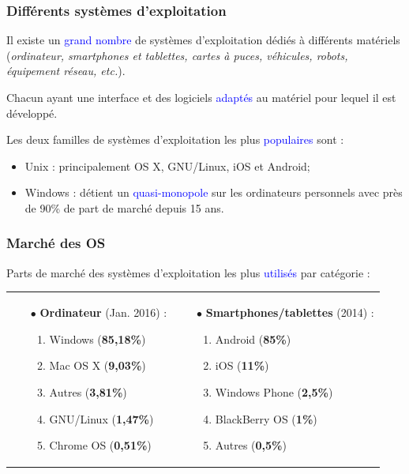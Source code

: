 \documentclass[aspectratio=169]{beamer}
\begin{document}
\begin{frame}
  \frametitle{Différents systèmes d'exploitation}
  Il existe un \textcolor{blue}{grand nombre} de systèmes d'exploitation dédiés
à différents matériels (\textit{ordinateur, smartphones et tablettes, cartes à
puces, véhicules, robots, équipement réseau, etc.}).

\hspace{0.5cm}

Chacun ayant une interface et des logiciels \textcolor{blue}{adaptés} au
matériel pour lequel il est développé.

\hspace{0.5cm}

Les deux familles de systèmes d'exploitation les plus
\textcolor{blue}{populaires} sont :

\hspace{0.5cm}

\begin{itemize}
\item Unix : principalement OS X, GNU/Linux, iOS et Android;

\item Windows : détient un \textcolor{blue}{quasi-monopole} sur les ordinateurs
personnels avec près de 90\% de part de marché depuis 15 ans.
\end{itemize}
\end{frame}

\begin{frame}
  \frametitle{Marché des OS}
  Parts de marché des systèmes d'exploitation les plus
\textcolor{blue}{utilisés} par catégorie : \\

\begin{tabular}{p{5cm} p{6.5cm}}
	\begin{itemize}
  \item[$\bullet$] \textbf{Ordinateur} (Jan. 2016) :
    \begin{enumerate}
    \item Windows (\textbf{85,18\%})
    \item Mac OS X (\textbf{9,03\%})
    \item Autres (\textbf{3,81\%})
    \item GNU/Linux (\textbf{1,47\%})
    \item Chrome OS (\textbf{0,51\%})
    \end{enumerate}
	\end{itemize}
	& \begin{itemize}
  \item[$\bullet$] \textbf{Smartphones/tablettes} (2014) :
    \begin{enumerate}
    \item Android (\textbf{85\%})
    \item iOS (\textbf{11\%})
    \item Windows Phone (\textbf{2,5\%})
    \item BlackBerry OS (\textbf{1\%})
    \item Autres (\textbf{0,5\%})
    \end{enumerate}
	\end{itemize}
\end{tabular}
\end{frame}
\end{document}
